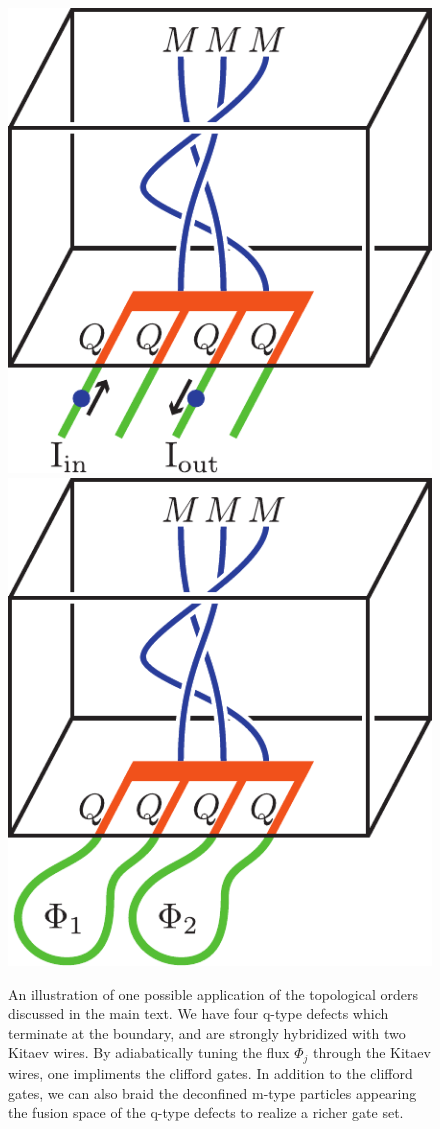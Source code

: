 \documentclass[12pt,a4paper]{article}
\begin{document}
\begin{figure}
\begin{center}
\includegraphics{QCApplication.pdf}
\includegraphics{QCApplication2.pdf}
\caption{\label{QCApplication}  
An illustration of one possible application of the topological orders discussed in the main text. 
We have four q-type defects which terminate at the boundary, and are strongly hybridized with two Kitaev wires. 
By adiabatically tuning the flux $\Phi_j$ through the Kitaev wires, one impliments the clifford gates. 
In addition to the clifford gates, we can also braid the deconfined m-type particles appearing the fusion space of the q-type defects to realize a richer gate set. 
}
\end{center}
\end{figure}
\end{document}
